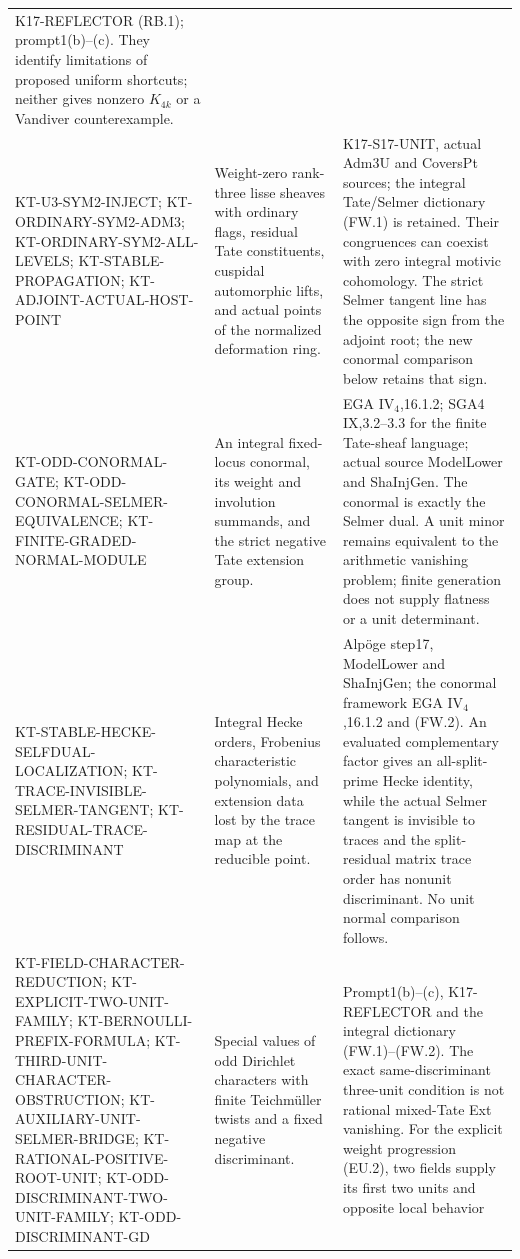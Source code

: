 \documentclass[11pt,a4paper]{article}
\theoremstyle{definition}
\begin{document}
\begin{longtable}{>{\raggedright\arraybackslash}p{}
>{\raggedright\arraybackslash}p{}
>{\raggedright\arraybackslash}p{}}
K17-REFLECTOR (RB.1); prompt1(b)--(c). They identify
limitations of proposed uniform shortcuts; neither gives
nonzero $K_{4k}$ or a Vandiver counterexample.\\
KT-U3-SYM2-INJECT; KT-ORDINARY-SYM2-ADM3;
KT-ORDINARY-SYM2-ALL-LEVELS;
KT-STABLE-PROPAGATION; KT-ADJOINT-ACTUAL-HOST-POINT &
Weight-zero rank-three lisse sheaves with ordinary flags,
residual Tate constituents, cuspidal automorphic lifts, and
actual points of the normalized deformation ring. &
K17-S17-UNIT, actual Adm3U and CoversPt sources; the integral
Tate/Selmer dictionary (FW.1) is retained. Their congruences
can coexist with zero integral motivic cohomology. The strict
Selmer tangent line has the opposite sign from the adjoint
root; the new conormal comparison below retains that sign.\\
KT-ODD-CONORMAL-GATE; KT-ODD-CONORMAL-SELMER-EQUIVALENCE;
KT-FINITE-GRADED-NORMAL-MODULE &
An integral fixed-locus conormal, its weight and involution
summands, and the strict negative Tate extension group. &
EGA IV$_4$,16.1.2; SGA4 IX,3.2--3.3 for the finite Tate-sheaf
language; actual source ModelLower and ShaInjGen.
The conormal is exactly the Selmer dual. A unit minor remains
equivalent to the arithmetic vanishing problem; finite
generation does not supply flatness or a unit determinant.\\
KT-STABLE-HECKE-SELFDUAL-LOCALIZATION;
KT-TRACE-INVISIBLE-SELMER-TANGENT;
KT-RESIDUAL-TRACE-DISCRIMINANT &
Integral Hecke orders, Frobenius characteristic polynomials,
and extension data lost by the trace map at the reducible point. &
Alp\"oge step17, ModelLower and ShaInjGen; the conormal
framework EGA IV$_4$,16.1.2 and (FW.2).
An evaluated complementary factor gives an all-split-prime
Hecke identity, while the actual Selmer tangent is invisible
to traces and the split-residual matrix trace order has
nonunit discriminant. No unit normal comparison follows.\\
KT-FIELD-CHARACTER-REDUCTION; KT-EXPLICIT-TWO-UNIT-FAMILY;
KT-BERNOULLI-PREFIX-FORMULA; KT-THIRD-UNIT-CHARACTER-OBSTRUCTION;
KT-AUXILIARY-UNIT-SELMER-BRIDGE; KT-RATIONAL-POSITIVE-ROOT-UNIT;
KT-ODD-DISCRIMINANT-TWO-UNIT-FAMILY; KT-ODD-DISCRIMINANT-GD &
Special values of odd Dirichlet characters with finite
Teichm\"uller twists and a fixed negative discriminant. &
Prompt1(b)--(c), K17-REFLECTOR and the integral dictionary
(FW.1)--(FW.2). The exact same-discriminant three-unit
condition is not rational mixed-Tate Ext vanishing.
For the explicit weight progression (EU.2), two fields
supply its first two units and opposite local behavior

\end{longtable}
\end{document}

